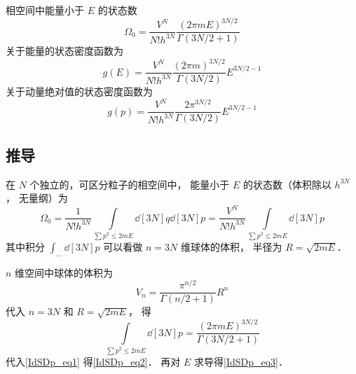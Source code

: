 
\begin{issues}
\issueDraft
\end{issues}


相空间中能量小于 $E$ 的状态数
\begin{equation}\label{IdSDp_eq2}
\Omega_0 = \frac{V^N}{N! h^{3N}} \frac{(2\pi mE)^{3N/2}}{\Gamma(3N/2+1)}
\end{equation}
关于能量的状态密度函数为
\begin{equation}\label{IdSDp_eq3}
g(E) = \frac{V^N}{N! h^{3N}} \frac{(2\pi m)^{3N/2}}{\Gamma(3N/2)} E^{3N/2 - 1}
\end{equation}
关于动量绝对值的状态密度函数为
\begin{equation}
g(p) = \frac{V^N}{N! h^{3N}} \frac{2\pi^{3N/2}}{\Gamma(3N/2)} E^{3N/2 - 1}
\end{equation}


\subsection{推导}
在 $N$ 个独立的，可区分粒子的相空间中， 能量小于 $E$ 的状态数（体积除以 $h^{3N}$， 无量纲）为
\begin{equation}\label{IdSDp_eq1}
\Omega_0 = \frac{1}{N! h^{3N}} \int\limits_{\sum p^2 \leqslant 2mE} \dd[3N]{q} \dd[3N]{p} = \frac{V^N}{N! h^{3N}} \int\limits_{\sum p^2 \leqslant 2mE} \dd[3N]{p}
\end{equation}
其中积分 $\int_{\dots} \dd[3N]{p} $ 可以看做 $n=3N$ 维球体的体积， 半径为 $R = \sqrt{2mE}$． 

$n$ 维空间中球体的体积为
\begin{equation}
V_n = \frac{\pi^{n/2}}{\Gamma(n/2+1)}R^n
\end{equation}
代入 $n=3N$ 和 $R = \sqrt{2mE} $， 得
\begin{equation}
\int\limits_{\sum p^2 \leqslant 2mE} \dd[3N]{p} = \frac{(2\pi mE)^{3N/2}}{\Gamma(3N/2+1)}
\end{equation}
代入\autoref{IdSDp_eq1} 得\autoref{IdSDp_eq2}． 再对 $E$ 求导得\autoref{IdSDp_eq3}．
